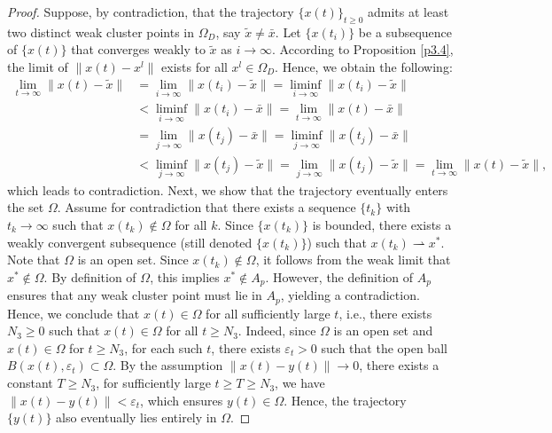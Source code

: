 \documentclass[hidelinks,11 pt]{article}
\numberwithin{equation}{section}
\theoremstyle{definition}  %
\numberwithin{equation}{section}
\numberwithin{theorem}{section}
\begin{document}
\begin{proof}
Suppose, by contradiction, that the trajectory $\{x(t)\}_{t \geq 0}$ admits at least two distinct weak cluster points in $\Omega_D$, say $\tilde{x} \neq \bar{x}$. Let $\{x(t_i)\}$ be a subsequence of $\{x(t)\}$ that converges weakly to $\tilde{x}$ as $i\to\infty$. According to Proposition \ref{p3.4}, the limit of $\|x(t)-x^l\|$ exists for all $x^l\in\Omega_{D}$. Hence, we obtain the following:
\begin{align*}
    \lim_{t\to\infty}\|x(t)-\tilde{x}\|& = \lim_{i\to\infty}\|x(t_i)-\tilde{x}\| = \liminf_{i\to\infty}\|x(t_i)-\tilde{x}\|\\
    &<\liminf_{i\to\infty}\|x(t_i)-\bar{x}\| =  \lim_{t\to\infty}\|x(t)-\bar{x}\|\\
    & = \lim_{j\to\infty}\|x(t_j)-\bar{x}\| = \liminf_{j\to\infty}\|x(t_j)-\bar{x}\|\\
    &< \liminf_{j\to\infty}\|x(t_j)-\tilde{x}\| = \lim_{j\to\infty}\|x(t_j)-\tilde{x}\| = \lim_{t\to\infty}\|x(t)-\tilde{x}\|,
\end{align*}
which leads to contradiction. 
\vskip 2mm
Next, we show that the trajectory eventually enters the set \(\Omega\). Assume for contradiction that there exists a sequence \(\{t_k\}\) with \(t_k \to \infty\) such that \(x(t_k) \notin \Omega\) for all \(k\). Since \(\{x(t_k)\}\) is bounded, there exists a weakly convergent subsequence (still denoted \(\{x(t_k)\}\)) such that \(x(t_k) \rightharpoonup x^*\).
Note that \(\Omega\) is an open set. Since \(x(t_k) \notin \Omega\), it follows from the weak limit that \(x^* \notin \Omega\). By definition of \(\Omega\), this implies \(x^* \notin A_p\). However, the definition of $A_p$ ensures that any weak cluster point must lie in \(A_p\), yielding a contradiction. Hence, we conclude that \(x(t) \in \Omega\) for all sufficiently large \(t\), i.e., there exists \(N_3 \geq 0\) such that \(x(t) \in \Omega\) for all \(t \geq N_3\).
\vskip 2mm 
 Indeed, since \(\Omega\) is an open set and \(x(t) \in \Omega\) for \(t \geq N_3\), for each such \(t\), there exists \(\varepsilon_t > 0\) such that the open ball \(B(x(t), \varepsilon_t) \subset \Omega\). By the assumption \(\|x(t) - y(t)\| \to 0\), there exists a constant $T\geq N_3$, for sufficiently large \(t\geq T\geq N_3\), we have \(\|x(t) - y(t)\| < \varepsilon_t\), which ensures \(y(t) \in \Omega\). Hence, the trajectory \(\{y(t)\}\) also eventually lies entirely in \(\Omega\).
\end{proof}
\end{document}
